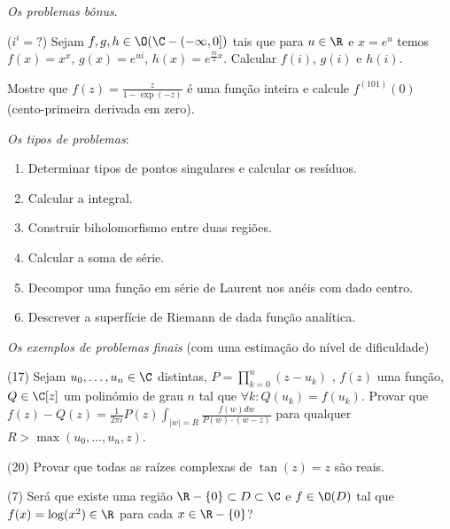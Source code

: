 \emph{Os problemas bônus}.

\begin{prob} ($i^i=?$)
Sejam $f,g,h \in \O(\C-(-\infty,0])$ tais que para $u\in\R$ e $x=e^u$
temos $f(x) = x^x$, $g(x) = e^{ui}$, $h(x) = e^{\frac{\pi i}{2} x}$.
Calcular $f(i)$, $g(i)$ e $h(i)$.
\end{prob}

\begin{prob}
Mostre que $f(z) = \frac{z}{1-\exp(-z)}$ é uma função inteira
e calcule $f^{(101)} (0)$ (cento-primeira derivada em zero).
\end{prob}

\bigskip

\emph{Os tipos de problemas}:
\begin{enumerate}
\item Determinar tipos de pontos singulares e calcular os resíduos.
\item Calcular a integral.
\item Construir biholomorfismo entre duas regiões.
\item Calcular a soma de série.
\item Decompor uma função em série de Laurent nos anéis com dado centro.
\item Descrever a superfície de Riemann de dada função analítica.
\end{enumerate}

\setcounter{prob}{0}

\medskip

\emph{Os exemplos de problemas finais} (com uma estimação do nível de dificuldade)

\begin{prob} (17)
Sejam $u_0,\dots,u_n\in\C$ distintas,
$P = \prod_{k=0}^n (z-u_k)$ ,
$f(z)$ uma função, $Q \in \C[z]$ um polinómio de grau $n$ tal que
$\forall k: Q(u_k) = f(u_k)$.
Provar que
$f(z) - Q(z) = \frac{1}{2\pi i} P(z) \int_{|w|=R} \frac{f(w) dw}{P(w) \cdot (w-z)}$
para qualquer $R > \max(u_0,\dots,u_n,z)$.
\end{prob}

\begin{prob} (20)
Provar que todas as raízes complexas de $\tan(z) = z$ são reais.
\end{prob}

\begin{prob} (7)
Será que existe uma região $\R-\{0\} \subset D\subset \C$ e $f\in\O(D)$ tal que
$f(x) = \log (x^2) \in \R$ para cada $x\in\R-\{0\}$?
\end{prob}

